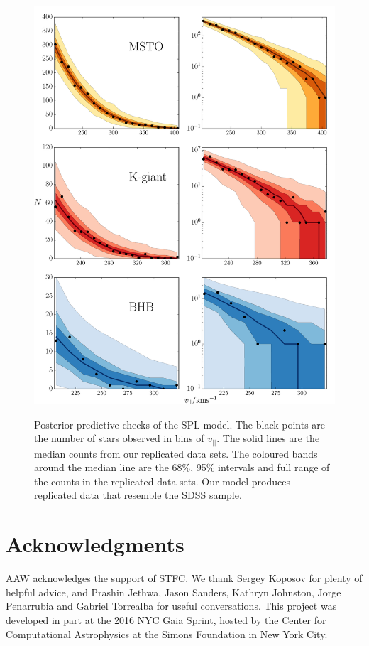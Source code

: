 \documentclass[useAMS,twocolumn,usenatbib]{mn2e}
\def\vlos{{v_{||}}}
\begin{document}
\begin{figure}
\includegraphics[width=1.5\columnwidth]{plots/ppc}\\
\caption{Posterior predictive checks of the SPL model. 
The black points are the number of stars observed in bins of $\vlos$. 
The solid lines are the median counts from our replicated data sets. 
The coloured bands around the median line are the 68\%, 95\% intervals and full range of the counts in the replicated data sets. 
Our model produces replicated data that resemble the SDSS sample.}
\label{fig:ppc}
\end{figure}

\section*{Acknowledgments}
AAW acknowledges the support of STFC. 
We thank Sergey Koposov for plenty of helpful advice, and Prashin Jethwa, Jason Sanders, Kathryn Johnston, Jorge Penarrubia and Gabriel Torrealba for useful conversations. 
This project was developed in part at the 2016 NYC Gaia Sprint, hosted by the Center for Computational Astrophysics at the Simons Foundation in New York City.
\end{document}
